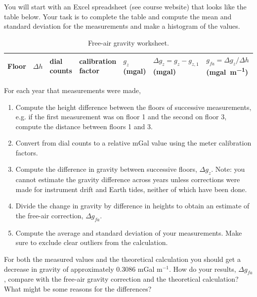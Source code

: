 \documentclass[11pt,a4paper,final]{article}
\begin{document}
You will start with an Excel spreadsheet (see course website) that looks like the table below.  Your task is to complete the table and compute the mean and standard deviation for the measurements and make a histogram of the values.
\begin{table}
    \caption{Free-air gravity worksheet.}
    \label{tab:fa}
    \begin{tabularx}{\textwidth}{|X|Y|Y|Y|Y|Y|Y|}
        \toprule
        \textbf{Floor} &
        $\Delta h$ &
        \textbf{dial counts} &
        \textbf{calibration \newline factor} &
        $g_{z}$ (\si{mgal}) &
        $\Delta g_{z} = g_{z} - g_{z,1}$ (\si{mgal}) &
        $g_{fa} = \Delta g_{z} / \Delta h$ (\si{mgal.m^{-1}})\\
        \bottomrule
    \end{tabularx}
\end{table}
For each year that measurements were made,
\begin{enumerate}
    \item Compute the height difference between the floors of successive measurements, e.g. if the first measurement was on floor 1 and the second on floor 3, compute the distance between floors 1 and 3.
    
    \item Convert from dial counts to a relative mGal value using the meter calibration factors.

    \item Compute the difference in gravity between successive floors, $\Delta g_{z}$. Note: you cannot estimate the gravity difference across years unless corrections were made for instrument drift and Earth tides, neither of which have been done.

    \item Divide the change in gravity by difference in heights to obtain an estimate of the free-air correction, $\Delta g_{fa}$.
    
    \item Compute the average and standard deviation of your measurements.  Make sure to exclude clear outliers from the calculation.
\end{enumerate}

For both the measured values and the theoretical calculation you should get a decrease in gravity of approximately 0.3086 mGal m$^{-1}$.  How do your results, $\Delta g_{fa}$, compare with the free-air gravity correction and the theoretical calculation?  What might be some reasons for the differences?
\end{document}
